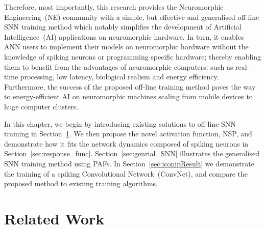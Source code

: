 Therefore, most importantly, this research provides the Neuromorphic Engineering~(NE) community with a simple, but effective and generalised off-line SNN training method which notably simplifies the development of Artificial Intelligence~(AI) applications on neuromorphic hardware.
In turn, it enables ANN users to implement their models on neuromorphic hardware without the knowledge of spiking neurons or programming specific hardware;
thereby enabling them to benefit from the advantages of neuromorphic computers: such as real-time processing, low latency, biological realism and energy efficiency.
Furthermore, the success of the proposed off-line training method paves the way to energy-efficient AI on neuromorphic machines scaling from mobile devices to huge computer clusters.



In this chapter, we begin by introducing existing solutions to off-line SNN training in Section~\ref{sec:NSP_relate}.
We then propose the novel activation function, NSP, and demonstrate how it fits the network dynamics composed of spiking neurons in Section~\ref{sec:response_func}.
Section~\ref{sec:genrial_SNN} illustrates the generalised SNN training method using PAFs.
In Section~\ref{sec:iconipResult} we demonstrate the training of a spiking Convolutional Network~(ConvNet), and compare the proposed method to existing training algorithms.

\section{Related Work}
\label{sec:NSP_relate}

